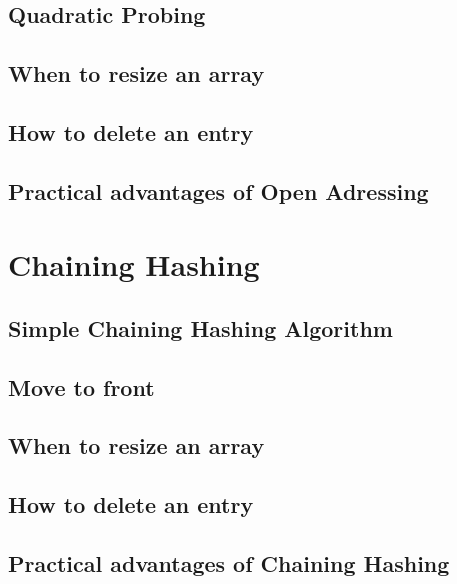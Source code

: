 \subsection{Quadratic Probing}

\subsection{When to resize an array}

\subsection{How to delete an entry}

\subsection{Practical advantages of Open Adressing}

\section{Chaining Hashing}

\subsection{Simple Chaining Hashing Algorithm}

\subsection{Move to front}

\subsection{When to resize an array}

\subsection{How to delete an entry}

\subsection{Practical advantages of Chaining Hashing}

